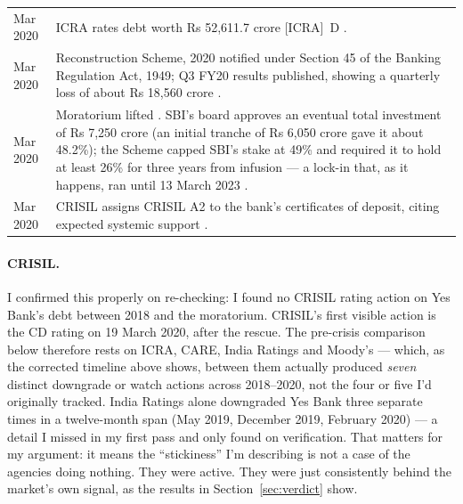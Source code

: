 \begin{longtable}{@{}>{\raggedright\arraybackslash}p{2.5cm}p{11.1cm}@{}}
6 Mar 2020 & ICRA rates debt worth Rs 52,611.7 crore [ICRA]~D \cite{bsMar9,icraMar20}.\\
13 Mar 2020 & Reconstruction Scheme, 2020 notified under Section 45 of the Banking Regulation Act, 1949; Q3 FY20 results published, showing a quarterly loss of about Rs 18,560 crore \cite{btQ3,crisilMar20,yesReconScheme}.\\
18 Mar 2020 & Moratorium lifted \cite{crisilMar20}. SBI's board approves an eventual total investment of Rs 7,250 crore (an initial tranche of Rs 6,050 crore gave it about 48.2\%); the Scheme capped SBI's stake at 49\% and required it to hold at least 26\% for three years from infusion --- a lock-in that, as it happens, ran until 13 March 2023 \cite{sbiStakeScheme,yesReconScheme}.\\
19 Mar 2020 & CRISIL assigns CRISIL A2 to the bank's certificates of deposit, citing expected systemic support \cite{crisilMar20}.\\
\bottomrule
\end{longtable}
\endgroup

\paragraph{CRISIL.} I confirmed this properly on re-checking: I found no CRISIL rating action on Yes Bank's debt between 2018 and the moratorium. CRISIL's first visible action is the CD rating on 19 March 2020, after the rescue. The pre-crisis comparison below therefore rests on ICRA, CARE, India Ratings and Moody's — which, as the corrected timeline above shows, between them actually produced \emph{seven} distinct downgrade or watch actions across 2018--2020, not the four or five I'd originally tracked. India Ratings alone downgraded Yes Bank three separate times in a twelve-month span (May 2019, December 2019, February 2020) — a detail I missed in my first pass and only found on verification. That matters for my argument: it means the ``stickiness'' I'm describing is not a case of the agencies doing nothing. They were active. They were just consistently behind the market's own signal, as the results in Section~\ref{sec:verdict} show.


